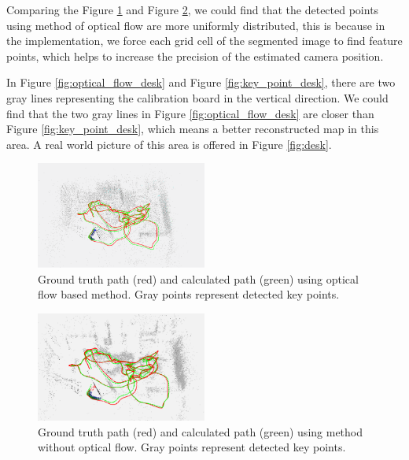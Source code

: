 \documentclass[conference]{IEEEtran}
\begin{document}
Comparing the Figure \ref{fig:optical_flow_global} and Figure \ref{fig:key_point_global}, we could find that the detected points using method of optical flow are more uniformly distributed, this is because in the implementation, we force each grid cell of the segmented image to find feature points, which helps to increase the precision of the estimated camera position.

In Figure \ref{fig:optical_flow_desk} and Figure \ref{fig:key_point_desk}, there are two gray lines representing the calibration board in the vertical direction. We could find that the two gray lines in Figure \ref{fig:optical_flow_desk} are closer than Figure \ref{fig:key_point_desk}, which means a better reconstructed map in this area. A real world picture of this area is offered in Figure 
\ref{fig:desk}.

\begin{figure}
	\label{fig:optical_flow_global}
	\centering
	\includegraphics[width=0.5\textwidth]{img/optical_flow_global.png}
	\caption{Ground truth path (red) and calculated path (green) using optical flow based method. Gray points represent detected key points.}
\end{figure}

\begin{figure}
	\label{fig:key_point_global}
	\centering
	\includegraphics[width=0.5\textwidth]{img/key_point_global.png}
	\caption{Ground truth path (red) and calculated path (green) using method without optical flow. Gray points represent detected key points.}
\end{figure}
\end{document}
